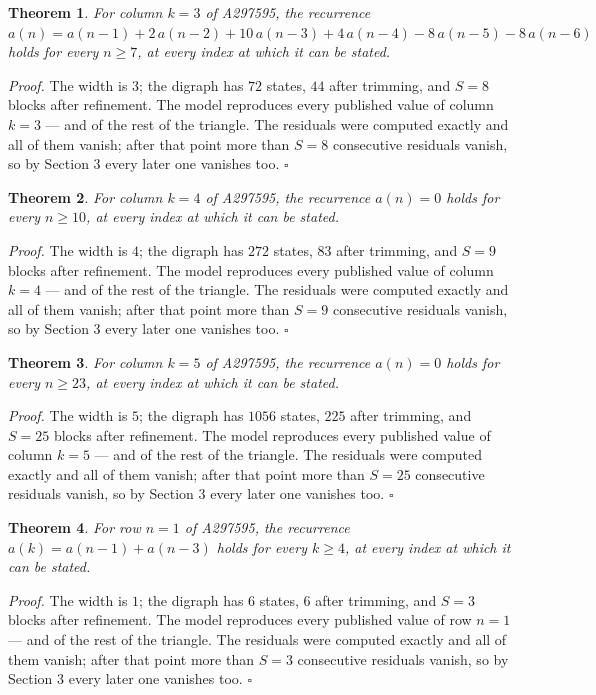 \documentclass[11pt]{article}
\newtheorem{theorem}{Theorem}
\theoremstyle{definition}
\begin{document}
\begin{theorem} For column $k = 3$ of A297595, the recurrence $a(n) = a(n-1) + 2\,a(n-2) + 10\,a(n-3) + 4\,a(n-4) - 8\,a(n-5) - 8\,a(n-6)$ holds for every $n \ge 7$, at every index at which it can be stated.\end{theorem}

{\itshape Proof.} The width is $3$; the digraph has $72$ states, $44$ after trimming, and $S = 8$ blocks after refinement. The model reproduces every published value of column $k = 3$ --- and of the rest of the triangle. The residuals were computed exactly and all of them vanish; after that point more than $S = 8$ consecutive residuals vanish, so by Section 3 every later one vanishes too. $\square$

\begin{theorem} For column $k = 4$ of A297595, the recurrence $a(n) = 0$ holds for every $n \ge 10$, at every index at which it can be stated.\end{theorem}

{\itshape Proof.} The width is $4$; the digraph has $272$ states, $83$ after trimming, and $S = 9$ blocks after refinement. The model reproduces every published value of column $k = 4$ --- and of the rest of the triangle. The residuals were computed exactly and all of them vanish; after that point more than $S = 9$ consecutive residuals vanish, so by Section 3 every later one vanishes too. $\square$

\begin{theorem} For column $k = 5$ of A297595, the recurrence $a(n) = 0$ holds for every $n \ge 23$, at every index at which it can be stated.\end{theorem}

{\itshape Proof.} The width is $5$; the digraph has $1056$ states, $225$ after trimming, and $S = 25$ blocks after refinement. The model reproduces every published value of column $k = 5$ --- and of the rest of the triangle. The residuals were computed exactly and all of them vanish; after that point more than $S = 25$ consecutive residuals vanish, so by Section 3 every later one vanishes too. $\square$

\begin{theorem} For row $n = 1$ of A297595, the recurrence $a(k) = a(n-1) + a(n-3)$ holds for every $k \ge 4$, at every index at which it can be stated.\end{theorem}

{\itshape Proof.} The width is $1$; the digraph has $6$ states, $6$ after trimming, and $S = 3$ blocks after refinement. The model reproduces every published value of row $n = 1$ --- and of the rest of the triangle. The residuals were computed exactly and all of them vanish; after that point more than $S = 3$ consecutive residuals vanish, so by Section 3 every later one vanishes too. $\square$
\end{document}
